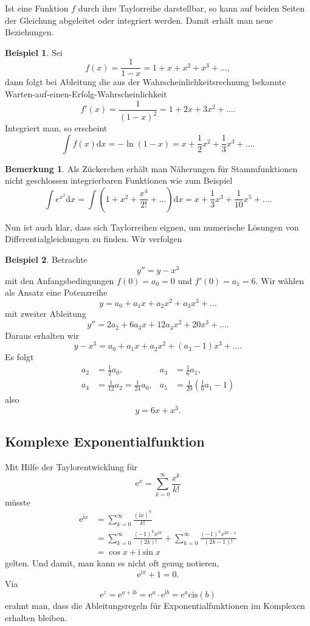 \documentclass[%
11pt,%
twoside,%
titlepage,%
swissgerman,%
headsepline%
]{scrartcl}
\theoremstyle{definition}
\newtheorem{bsp}{Beispiel}[section] %
\newtheorem{bem}{Bemerkung}[section] %
\theoremstyle{plain}
\begin{document}
Ist eine Funktion $f$ durch ihre Taylorreihe darstellbar, so kann auf beiden Seiten der Gleichung abgeleitet oder integriert werden. Damit erhält man neue Beziehungen.

\begin{bsp}
Sei
$$f(x)=\frac{1}{1-x}=1+x+x^2+x^3+\dots,$$
dann folgt bei Ableitung die aus der Wahrscheinlichkeitsrechnung bekannte \glqq Warten-auf-einen-Erfolg-Wahrscheinlichkeit\grqq
$$f'(x)=\frac{1}{(1-x)^2}=1+2x+3x^2+\dots.$$
Integriert man, so erscheint
$$\int f(x) \mathrm{d}x=-\ln(1-x)=x+\frac{1}{2}x^2+\frac{1}{3}x^3+\dots.$$
\end{bsp}

\begin{bem}
Als Zückerchen erhält man Näherungen für Stammfunktionen nicht geschlossen integrierbaren Funktionen wie zum Beispiel
$$
\int e^{x^2}\mathrm{d}x =\int\left(1+x^2+\frac{x^4}{2!}+\dots\right)\mathrm{d}x=x+\frac{1}{3}x^3+\frac{1}{10}x^5+\dots.
$$
\end{bem}

Nun ist auch klar, dass sich Taylorreihen eignen, um numerische Lösungen von Differentialgleichungen zu finden. Wir verfolgen
\begin{bsp}
Betrachte
$$y''=y-x^3$$
mit den Anfangsbedingungen $f(0)=a_0=0$ und $f'(0)=a_1=6$. Wir wählen als Ansatz eine Potenzreihe
$$y=a_0+a_1x+a_2x^2+a_3x^3+\dots$$
mit zweiter Ableitung
$$y''=2a_2+6a_3x+12a_4x^2+20x^3+\dots.$$
Daraus erhalten wir
$$y-x^3=a_0+a_1x+a_2x^2+(a_3-1)x^3+\dots.$$
Es folgt
\begin{align*}
a_2&=\frac{1}{2}a_0, &a_3&=\frac{1}{6}a_1,\\
a_4&=\frac{1}{12}a_2=\frac{1}{24}a_0, &a_5&=\frac{1}{20}(\frac{1}{6}a_1-1)
\end{align*}
also
$$y=6x+x^3.$$
\end{bsp}

\subsection{Komplexe Exponentialfunktion}

Mit Hilfe der Taylorentwicklung für
$$\mathrm{e}^x=\sum_{k=0}^\infty\frac{x^k}{k!}$$
müsste
\begin{align*}
\mathrm{e}^{\mathrm{i}x}&=\sum_{k=0}^\infty\frac{(\mathrm{i}x)^k}{k!}\\
&=\sum_{k=0}^\infty\frac{(-1)^kx^{2k}}{(2k)!}+\sum_{k=0}^\infty\frac{(-1)^kx^{2k-1}}{(2k-1)!}\\
&=\cos x+\mathrm{i}\sin x
\end{align*}
gelten. Und damit, man kann es nicht oft genug notieren,
$$\mathrm{e}^{\mathrm{i}\pi}+1=0.$$
Via
$$\mathrm{e}^z=\mathrm{e}^{a+\mathrm{i}b}=\mathrm{e}^a\cdot \mathrm{e}^{\mathrm{i}b}=\mathrm{e}^a\mathrm{cis}(b)$$
erahnt man, dass die Ableitungsregeln für Exponentialfunktionen im Komplexen erhalten bleiben.
\end{document}
